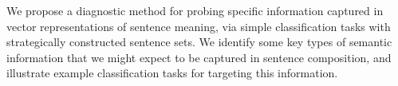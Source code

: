 We propose a diagnostic method for probing specific information captured in vector representations of sentence meaning, via simple classification tasks with strategically constructed sentence sets. We identify some key types of semantic information that we might expect to be captured in sentence composition, and illustrate example classification tasks for targeting this information.
